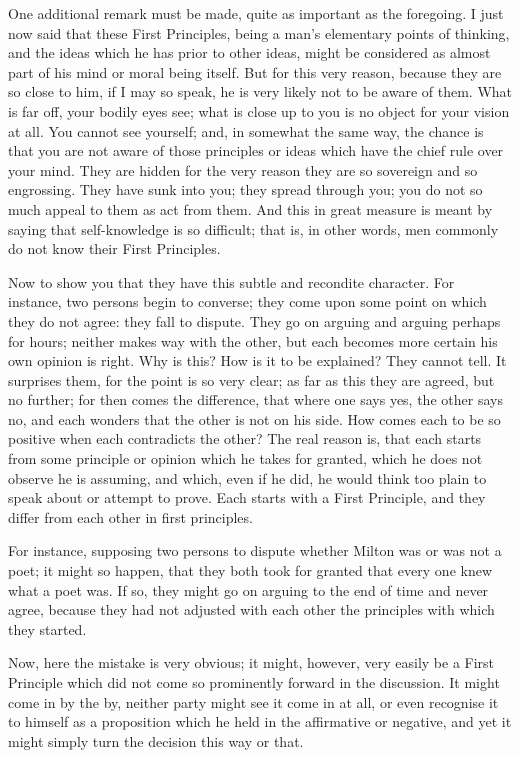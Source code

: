One additional remark must be made, quite as important
as the foregoing. I just now said that these First
Principles, being a man's elementary points of thinking,
and the ideas which he has prior to other ideas, might be
considered as almost part of his mind or moral being
itself. But for this very reason, because they are so
close to him, if I may so speak, he is very likely not to
be aware of them. What is far off, your bodily eyes see;
what is close up to you is no object for your vision at
all. You cannot see yourself; and, in somewhat the same
way, the chance is that you are not aware of those
principles or ideas which have the chief rule over your
mind. They are hidden for the very reason they are so
sovereign and so engrossing. They have sunk into you;
they spread through you; you do not so much appeal to
them as act from them. And this in great measure is meant
by saying that self-knowledge is so difficult; that is,
in other words, men commonly do not know their First
Principles.

Now to show you that they have this subtle and
recondite character. For instance, two persons begin to
converse; they come upon some point on which they do not
agree: they fall to dispute. They go on arguing and
arguing perhaps for hours; neither makes way with the
other, but each becomes more certain his own opinion is
right. Why is this? How is it to be explained? They
cannot tell. It surprises them, for the point is so very
clear; as far as this they are agreed, but no further;
for then comes the difference, that where one says yes,
the other says no, and each wonders that the other is not
on his side. How comes each to be so positive when each
contradicts the other? The real reason is, that each
starts from some principle or opinion which he takes for
granted, which he does not observe he is assuming, and
which, even if he did, he would think too plain to speak
about or attempt to prove. Each starts with a First
Principle, and they differ from each other in first
principles.

For instance, supposing two persons to dispute whether
Milton was or was not a poet; it might so happen, that
they both took for granted that every one knew what a
poet was. If so, they might go on arguing to the end of
time and never agree, because they had not adjusted with
each other the principles with which they started.

Now, here the mistake is very obvious; it might,
however, very easily be a First Principle which did not
come so prominently forward in the discussion. It might
come in by the by, neither party might see it come in at
all, or even recognise it to himself as a proposition
which he held in the affirmative or negative, and yet it
might simply turn the decision this way or that.

